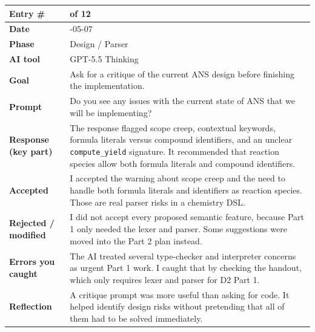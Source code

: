 \documentclass[11pt,a4paper]{article}
\newcommand{\code}[1]{\texttt{#1}}
\newcommand{\entrygap}{\vspace{8pt}}
\newenvironment{journalentry}{%
  \begin{center}\small\renewcommand{\arraystretch}{1.22}%
  \begin{tabular}{|>{\columncolor{anscodebg}\bfseries}p{3.0cm}|>{\RaggedRight\arraybackslash}p{12.25cm}|}%
  \hline
}{%
  \end{tabular}\end{center}\entrygap
}
\begin{document}
\begin{journalentry}
Entry \# & 8 of 12 \\ \hline
Date & 2026-05-07 \\ \hline
Phase & Design / Parser \\ \hline
AI tool & GPT-5.5 Thinking \\ \hline
Goal & Ask for a critique of the current ANS design before finishing the implementation. \\ \hline
Prompt & Do you see any issues with the current state of ANS that we will be implementing? \\ \hline
Response (key part) & The response flagged scope creep, contextual keywords, formula literals versus compound identifiers, and an unclear \code{compute\_yield} signature. It recommended that reaction species allow both formula literals and compound identifiers. \\ \hline
Accepted & I accepted the warning about scope creep and the need to handle both formula literals and identifiers as reaction species. Those are real parser risks in a chemistry DSL. \\ \hline
Rejected / modified & I did not accept every proposed semantic feature, because Part 1 only needed the lexer and parser. Some suggestions were moved into the Part 2 plan instead. \\ \hline
Errors you caught & The AI treated several type-checker and interpreter concerns as urgent Part 1 work. I caught that by checking the handout, which only requires lexer and parser for D2 Part 1. \\ \hline
Reflection & A critique prompt was more useful than asking for code. It helped identify design risks without pretending that all of them had to be solved immediately. \\ \hline
\end{journalentry}
\end{document}
